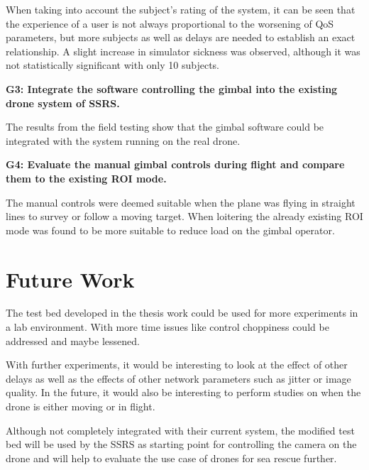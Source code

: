 \documentclass[nofilelist]{cslthse-msc}
\begin{document}
\begin{description}
   When taking into account the subject's rating of the system, it can be seen that the experience of a user is not always proportional to the worsening of QoS parameters, but more subjects as well as delays are needed to establish an exact relationship. A slight increase in simulator sickness was observed, although it was not statistically significant with only 10 subjects.

   \item \textbf{G3: Integrate the software controlling the gimbal into the existing drone system of SSRS.}

   \item
   The results from the field testing show that the gimbal software could be integrated with the system running on the real drone.

   \item \textbf{G4: Evaluate the manual gimbal controls during flight and compare them to the existing ROI mode.}
   \item
   The manual controls were deemed suitable when the plane was flying in straight lines to survey or follow a moving target. When loitering the already existing ROI mode was found to be more suitable to reduce load on the gimbal operator.

\end{description}

\chapter{Future Work}
The test bed developed in the thesis work could be used for more experiments in a lab environment. With more time issues like control choppiness could be addressed and maybe lessened.

With further experiments, it would be interesting to look at the effect of other delays as well as the effects of other network parameters such as jitter or image quality. In the future, it would also be interesting to perform studies on when the drone is either moving or in flight.

Although not completely integrated with their current system, the modified test bed will be used by the SSRS as starting point for controlling the camera on the drone and will help to evaluate the use case of drones for sea rescue further.

{}
\end{document}

